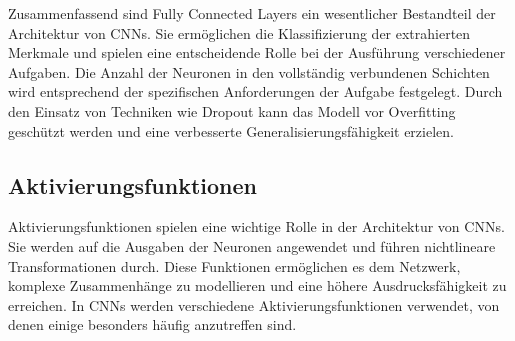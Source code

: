     Zusammenfassend sind Fully Connected Layers ein wesentlicher Bestandteil der Architektur von CNNs. Sie ermöglichen die Klassifizierung der extrahierten Merkmale und spielen eine entscheidende Rolle bei der Ausführung verschiedener Aufgaben. Die Anzahl der Neuronen in den vollständig verbundenen Schichten wird entsprechend der spezifischen Anforderungen der Aufgabe festgelegt. Durch den Einsatz von Techniken wie Dropout kann das Modell vor Overfitting geschützt werden und eine verbesserte Generalisierungsfähigkeit erzielen.

\subsection{Aktivierungsfunktionen}

    Aktivierungsfunktionen spielen eine wichtige Rolle in der Architektur von \acfp{CNN}. 
    Sie werden auf die Ausgaben der Neuronen angewendet und führen nichtlineare Transformationen durch. 
    Diese Funktionen ermöglichen es dem Netzwerk, komplexe Zusammenhänge zu modellieren und eine höhere Ausdrucksfähigkeit zu erreichen.    
    In CNNs werden verschiedene Aktivierungsfunktionen verwendet, von denen einige besonders häufig anzutreffen sind. 

